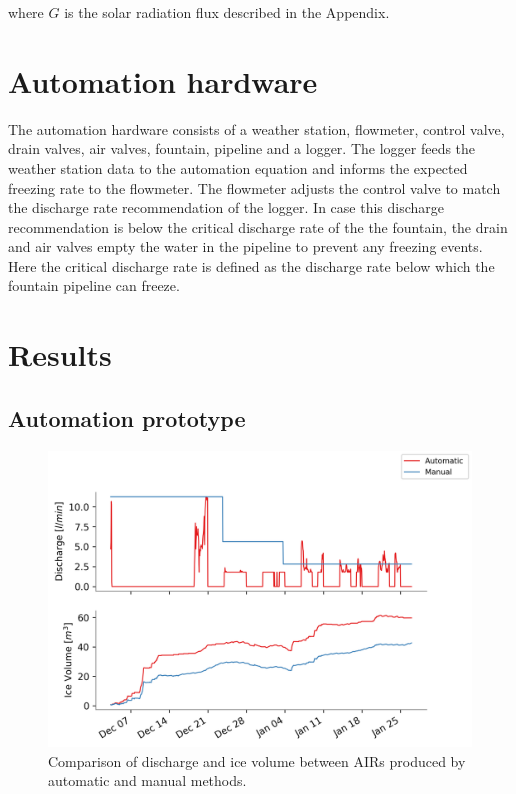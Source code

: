 \documentclass[utf8]{frontiersSCNS}
\begin{document}
where $G$ is the solar radiation flux described in the Appendix.

\section{Automation hardware}

The automation hardware consists of a weather station, flowmeter, control valve, drain valves, air valves,
fountain, pipeline and a logger. The logger feeds the weather station data to the automation equation and
informs the expected freezing rate to the flowmeter. The flowmeter adjusts the control valve to match the
discharge rate recommendation of the logger. In case this discharge recommendation is below the critical
discharge rate of the the fountain, the drain and air valves empty the water in the pipeline to prevent any
freezing events. Here the critical discharge rate is defined as the discharge rate below which the fountain
pipeline can freeze.


\section{Results}

\subsection{Automation prototype}

\begin{figure}
	\begin{center}
		\includegraphics[width=\linewidth]{Figures/autovsmanual.png}
	\end{center}
	\caption{Comparison of discharge and ice volume between AIRs produced by automatic and manual methods. }
	\label{fig:old_icestupa}
\end{figure}
\end{document}
